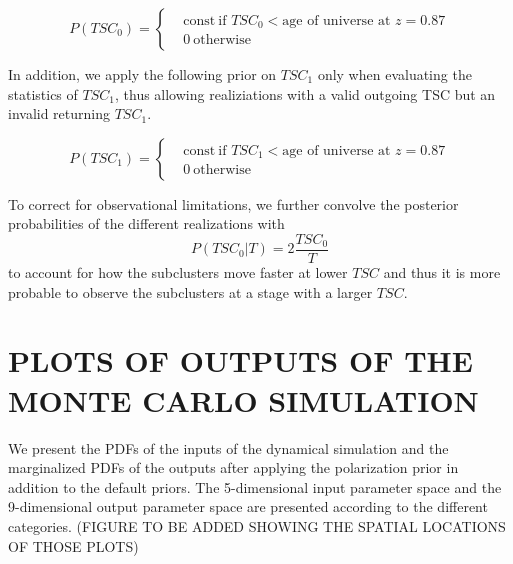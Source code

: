 \begin{equation}
	P(TSC_0) = 
	\begin{cases}
		& \text{const}~\text{if }TSC_0 < \text{age of universe at } z=0.87	\\
		& 0~\text{otherwise}
	\end{cases}
\end{equation}

In addition, we apply the following prior on $TSC_1$ only when evaluating the
statistics of $TSC_1$, thus allowing realiziations with a valid
outgoing TSC but an invalid returning $TSC_1$. 

\begin{equation}
	P(TSC_1) = 
	\begin{cases}
		& \text{const}~\text{if }TSC_1 < \text{age of universe at } z=0.87	\\
		& 0~\text{otherwise} \label{eqn:TSM_1}
	\end{cases}
\end{equation}

To correct for observational limitations, we further convolve the
posterior probabilities of the different realizations with 
\begin{equation}
	P(TSC_0 | T) = 2 \frac{TSC_0}{T}
\end{equation}
to account for how the subclusters move faster at lower $TSC$ and thus it
is more probable to observe the subclusters at a stage with a larger $TSC$.

\par 

%

\section{PLOTS OF OUTPUTS OF THE MONTE CARLO SIMULATION}
%

We present the PDFs of the inputs of the dynamical simulation and the
marginalized PDFs of the outputs after applying the polarization prior in
addition to the default priors. The 5-dimensional input parameter space and
the 9-dimensional output parameter space are presented according to
the different categories.  
(FIGURE TO BE ADDED SHOWING THE SPATIAL LOCATIONS OF THOSE PLOTS)



